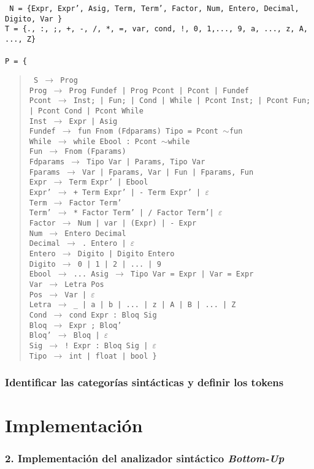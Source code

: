\documentclass[12pt]{article}
\begin{document}
\noindent
\noindent
\texttt{
  \noindent
N = \{Expr, Expr', Asig, Term, Term', Factor, Num, Entero, Decimal, Digito, Var \}\\
T = \{., :, ;, +, -, /, *, =, var, cond, !, 0, 1,..., 9, a, ..., z, A, ..., Z\}\\ \\ 
P = \{}
\begin{quote}
  \texttt{
    S $\to$ Prog\\
    Prog $\to$ Prog Fundef | Prog Pcont | Pcont | Fundef\\
    Pcont $\to$ Inst; | Fun; | Cond | While | Pcont Inst; | Pcont Fun; | Pcont Cond | Pcont While\\
    Inst $\to$ Expr | Asig\\
    Fundef $\to$ fun Fnom (Fdparams) Tipo = Pcont $\sim$fun\\
    While $\to$ while Ebool : Pcont $\sim$while\\    
    Fun $\to$ Fnom (Fparams)\\
    Fdparams $\to$ Tipo Var | Params, Tipo Var\\
    Fparams $\to$ Var | Fparams, Var | Fun | Fparams, Fun\\
    Expr  $\to$ Term Expr' | Ebool \\
    Expr' $\to$ + Term Expr' | - Term Expr' | $\varepsilon$ \\
    Term  $\to$ Factor Term' \\
    Term' $\to$ * Factor Term' | / Factor Term'| $\varepsilon$ \\
    Factor $\to$ Num | var | (Expr) | - Expr \\
    Num $\to$ Entero Decimal \\
    Decimal $\to$ . Entero | $\varepsilon$ \\
    Entero $\to$ Digito | Digito Entero \\
    Digito $\to$ 0 | 1 | 2 | ... | 9 \\
    Ebool $\to$ ...
    Asig $\to$ Tipo Var = Expr | Var = Expr \\
    Var  $\to$ Letra Pos \\
    Pos  $\to$ Var | $\varepsilon$ \\
    Letra $\to$ \_ | a | b | ... | z | A | B | ... | Z \\
    Cond $\to$ cond Expr : Bloq Sig \\
    Bloq $\to$ Expr ; Bloq'\\
    Bloq' $\to$ Bloq | $\varepsilon$\\ 
    Sig $\to$ ! Expr : Bloq Sig | $\varepsilon$ \\
    Tipo $\to$ int | float | bool
    \}
}
 
\end{quote}

\subsubsection*{Identificar las categorías sintácticas y definir los tokens}

\section{Implementación}
\subsubsection*{2. Implementación del analizador sintáctico \textit{Bottom-Up}}
\end{document}
